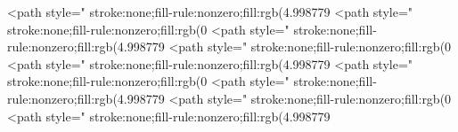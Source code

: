 <path style=" stroke:none;fill-rule:nonzero;fill:rgb(4.998779%
<path style=" stroke:none;fill-rule:nonzero;fill:rgb(0%
<path style=" stroke:none;fill-rule:nonzero;fill:rgb(4.998779%
<path style=" stroke:none;fill-rule:nonzero;fill:rgb(0%
<path style=" stroke:none;fill-rule:nonzero;fill:rgb(4.998779%
<path style=" stroke:none;fill-rule:nonzero;fill:rgb(0%
<path style=" stroke:none;fill-rule:nonzero;fill:rgb(4.998779%
<path style=" stroke:none;fill-rule:nonzero;fill:rgb(0%
<path style=" stroke:none;fill-rule:nonzero;fill:rgb(4.998779%
